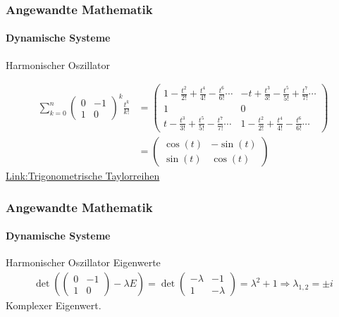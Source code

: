 \documentclass{beamer}
\begin{document}
 \begin{frame}
    \frametitle{Angewandte Mathematik}
\framesubtitle{Dynamische Systeme }
\begin{block}{Harmonischer Oszillator}

\begin{align*}
\sum_{k= 0}^{n} \begin{pmatrix}
    0 & -1  \\ 1 & 0
\end{pmatrix}^{k} \frac{t^k}{k!} & =
\begin{pmatrix}
    1-\frac{t^2}{2!} + \frac{t^4}{4!}-\frac{t^6}{6!} \cdots & -t +\frac{t^3}{3!} - \frac{t^5}{5!} +\frac{t^7}{7!} \cdots  \\ 1 & 0 \\
    t -\frac{t^3}{3!} + \frac{t^5}{5!} -\frac{t^7}{7!} \cdots  & 1-\frac{t^2}{2!} + \frac{t^4}{4!}-\frac{t^6}{6!}  \cdots
\end{pmatrix} \\
&= \begin{pmatrix}
    \cos(t) & -\sin(t)  \\ \sin(t) & \cos(t)
\end{pmatrix}
\end{align*}
\href{https://de.wikipedia.org/wiki/Taylorreihe}{Link:Trigonometrische Taylorreihen}
\end{block}
 \end{frame}







 \begin{frame}
    \frametitle{Angewandte Mathematik}
\framesubtitle{Dynamische Systeme }

\begin{block}{Harmonischer Oszillator Eigenwerte}
    \begin{align*}
    \det (\begin{pmatrix}
        0 & -1  \\ 1 & 0
    \end{pmatrix} - \lambda E) = 
    \det \begin{pmatrix}
        -\lambda & -1  \\ 1 & -\lambda  
    \end{pmatrix} = \lambda^2 +1 \Rightarrow \lambda_{1,2} = \pm i
\end{align*}
Komplexer Eigenwert.
 \end{block}
 \end{frame}
\end{document}

